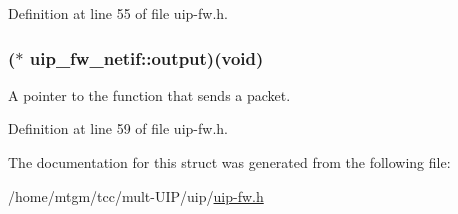 Definition at line 55 of file uip-\/fw.h.

\hypertarget{structuip__fw__netif_a42104d06ce44f17243f166c4e9d0a051}{
\subsubsection[{output}]{($\ast$  {\bf uip\_\-fw\_\-netif::output})(void)}}
\label{structuip__fw__netif_a42104d06ce44f17243f166c4e9d0a051}
A pointer to the function that sends a packet. 

Definition at line 59 of file uip-\/fw.h.



The documentation for this struct was generated from the following file:\begin{DoxyCompactItemize}
\item 
/home/mtgm/tcc/mult-\/UIP/uip/\hyperlink{uip-fw_8h}{uip-\/fw.h}\end{DoxyCompactItemize}
